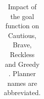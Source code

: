 \begin{table}[tb]
{\begin{tabular}{|l||ccccccccc||ccccccccc||}
        \end{tabular}}
        \caption{Impact of the goal function on Cautious, Brave, Reckless and Greedy \pattyd. Planner names are abbreviated.}
        \label{tab:abl-gf}
        \end{table}
        
